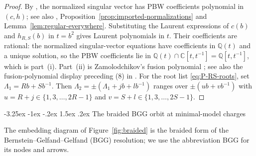 \documentclass[twoside,10pt]{article}
\makeatletter
\numberwithin{equation}{section}
\theoremstyle{slbody}
\theoremstyle{definition}
\theoremstyle{remark}
\renewcommand{\subsection}{%
  \@startsection{subsection}{2}{\z@}%
    {-3.25ex \@plus -1ex \@minus -.2ex}%
    {1.5ex \@plus .2ex}%
    {\normalfont\normalsize\bfseries}}
\makeatother
\begin{document}
\begin{proof}
By \cite[Theorem~3.1]{Astashkevich1997}, the normalized singular vector has
PBW coefficients polynomial in \((c,h)\); see also
\cite[Propositions~5.1--5.2 and Corollary~5.2]{IoharaKoga2011},
Proposition~\ref{prop:imported-normalizations} and
Lemma~\ref{lem:regular-everywhere}.  Substituting the Laurent expressions of
\(c(b)\) and \(h_{R,S}(b)\) in \(t=b^2\) gives Laurent polynomials in \(t\).
Their coefficients are rational: the normalized singular-vector equations
have coefficients in \(\mathbb Q(t)\) and a unique solution, so the PBW
coefficients lie in \(\mathbb Q(t)\cap\mathbb C[t,t^{-1}]=\mathbb Q[t,t^{-1}]\), which is part~(i).
Part~(ii) is Zamolodchikov's fusion polynomial
\cite[\S5, (5.9)--(5.12)]{Zamolodchikov2004}; see also the
fusion-polynomial display preceding (8) in
\cite[\S3]{HadaszJaskolskiSuchanek2010}.  For the
root list \eqref{eq:P-RS-roots}, set \(\Lambda_1=Rb+Sb^{-1}\).  Then
\(\Lambda_2=\pm(\Lambda_1+jb+lb^{-1})\) ranges over \(\pm(ub+vb^{-1})\) with
\(u=R+j\in\{1,3,\ldots,2R-1\}\) and \(v=S+l\in\{1,3,\ldots,2S-1\}\).
\end{proof}

\subsection{The braided BGG orbit at minimal-model charges}

The embedding diagram of Figure~\ref{fig:braided} is the braided form of the
Bernstein--Gelfand--Gelfand (BGG) resolution; we use the abbreviation BGG for
its nodes and arrows.
\end{document}
